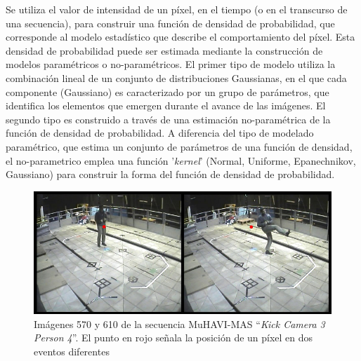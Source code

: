 Se utiliza el valor de intensidad de un píxel, en el tiempo (o en el transcurso de una secuencia), para construir una función de densidad de probabilidad, que corresponde al modelo estadístico que describe el comportamiento del píxel. Esta densidad de probabilidad puede ser estimada mediante la construcción de modelos paramétricos o no-paramétricos. El primer tipo de modelo utiliza la combinación lineal de un conjunto de distribuciones Gaussianas, en el que cada componente (Gaussiano) es caracterizado por un grupo de parámetros, que identifica los elementos que emergen durante el avance de las imágenes. El segundo tipo es construido a través de una estimación no-paramétrica de la función de densidad de probabilidad. A diferencia del tipo de modelado paramétrico, que estima un conjunto de parámetros de una función de densidad, el no-parametrico emplea una función '\textit{kernel}' (Normal, Uniforme, Epanechnikov, Gaussiano) para construir la forma del función de densidad de probabilidad.



\begin{figure}[h!]
  \centering
      \includegraphics[scale=0.5]{img/ch3/figura_3_1}
  \caption[Imágenes 570, 610 de secuencia ``\textit{Kick Camera 3 Person 4}'']{Imágenes 570 y 610 de la secuencia MuHAVI-MAS ``\textit{Kick Camera 3 Person 4}''. El punto en rojo señala la posición de un píxel en dos eventos diferentes}
\label{posicion_340_160}
\end{figure}

